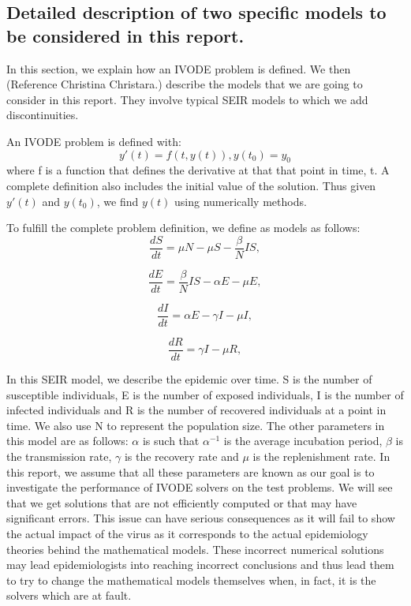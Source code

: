 \subsection{Detailed description of two specific models to be considered in this report.} 
\label{subsection:SEIR_model}
In this section, we explain how an IVODE problem is defined. We then (Reference Christina Christara.) describe the models that we are going to consider in this report. They involve typical SEIR models to which we add discontinuities.

An IVODE problem is defined with:
\begin{equation}
y'(t) = f(t, y(t)), y(t_0) = y_0 \nonumber
\end{equation}
where f is a function that defines the derivative at that that point in time, t. A complete definition also includes the initial value of the solution. Thus given $y'(t)$ and $y(t_0)$, we find $y(t)$ using numerically methods. 

To fulfill the complete problem definition, we define as models as follows:
\begin{equation}
\frac{\textit{d}S}{\textit{dt}} = \mu N - \mu S - \frac{\beta}{N}IS, \nonumber
\end{equation}

\begin{equation}
\frac{\textit{d}E}{\textit{dt}} = \frac{\beta}{N}IS - \alpha E - \mu E, \nonumber
\end{equation}

\begin{equation}
\frac{\textit{d}I}{\textit{dt}} = \alpha E - \gamma I - \mu I, \nonumber
\end{equation}

\begin{equation}
\frac{\textit{d}R}{\textit{dt}} = \gamma I - \mu R, \nonumber
\end{equation} 

In this SEIR model, we describe the epidemic over time. S is the number of susceptible individuals, E is the number of exposed individuals, I is the number of infected individuals and R is the number of recovered individuals at a point in time. We also use N to represent the population size.
The other parameters in this model are as follows: $\alpha$ is such that $\alpha^{-1}$ is the average incubation period, $\beta$ is the transmission rate, $\gamma$ is the recovery rate and $\mu$ is the replenishment rate. In this report, we assume that all these parameters are known as our goal is to investigate the performance of IVODE solvers on the test problems. We will see that we get solutions that are not efficiently computed or that may have significant errors. This issue can have serious consequences as it will fail to show the actual impact of the virus as it corresponds to the actual epidemiology theories behind the mathematical models. These incorrect numerical solutions may lead epidemiologists into reaching incorrect conclusions and thus lead them to try to change the mathematical models themselves when, in fact, it is the solvers which are at fault.

